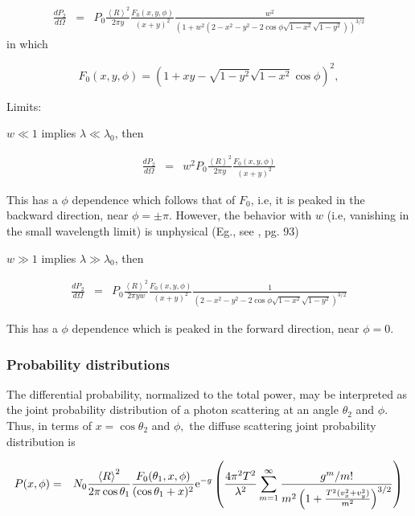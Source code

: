 \documentclass[11pt,openany]{report}
\newcommand{\der}[2]{\frac{d {#1}}{d {#2}}}
\newcommand{\e}{{\rm e}}
\begin{document}
{{\begin{eqnarray}
\der{P_{2}}{\Omega}&=&
P_{0}\frac{\left<R\right>^{2}}{2\pi y}\frac{F_{0}(x,y,\phi)}{(x+y)^{2}}\frac{w^{2}}{\left(1+w^{2}\left(2-x^{2}-y^{2}-2\cos\phi\sqrt{1-x^{2}}\sqrt{1-y^{2}}\right)\right)^{3/2}}
\end{eqnarray}
in which

$$F_{0}(x,y,\phi)=\left(1+xy-\sqrt{1-y^{2}}\sqrt{1-x^{2}}\cos\phi\right)^{2},$$

Limits: 

$w\ll1$ implies $\lambda \ll \lambda_{0}$, then

\begin{eqnarray}
\der{P_{2}}{\Omega}&=&w^{2}
P_{0}\frac{\left<R\right>^{2}}{2\pi y}\frac{F_{0}(x,y,\phi)}{(x+y)^{2}}\end{eqnarray}

This has a $\phi$ dependence which follows that of $F_{0}$, i.e, it is peaked in the backward direction, near $\phi=\pm\pi$. However, the behavior with $w$ (i.e, vanishing in the small wavelength limit) is unphysical (Eg., see \cite{b:ogilvy}, pg. 93)

$w\gg1$ implies $\lambda \gg \lambda_{0}$, then

\begin{eqnarray}
\der{P_{2}}{\Omega}&=&
P_{0}\frac{\left<R\right>^{2}}{2\pi y w}\frac{F_{0}(x,y,\phi)}{(x+y)^{2}}\frac{1}{\left(2-x^{2}-y^{2}-2\cos\phi\sqrt{1-x^{2}}\sqrt{1-y^{2}}\right)^{3/2}}\end{eqnarray}


This has a $\phi$ dependence which is peaked in the forward direction, near $\phi=0$.

\subsubsection{Probability distributions}

The differential probability, normalized to the total power, may be interpreted as the joint probability distribution of a photon scattering at an angle $\theta_{2}$ and $\phi$.  Thus, in terms of $x=\cos\theta_{2}$ and $\phi,$ the diffuse scattering joint probability distribution is

\begin{eqnarray}
P(x,\phi)&=&N_{0}\frac{\left<R\right>^{2}}{2\pi\cos\theta_{1}}\frac{F_{0}(\theta_{1},x,\phi)}{(\cos{\theta_{1}}+x)^{2}}
\e^{-g}\left(\frac{4\pi^{2}T^{2}}{\lambda^{2}}\sum_{m=1}^{\infty}\frac{g^{m}/m!}{m^{2}\left(1+\frac{T^{2}(v_{x}^{2}+v_{y}^{2})}{m^{2}}\right)^{3/2}}\right)\end{eqnarray}

}}
\end{document}
